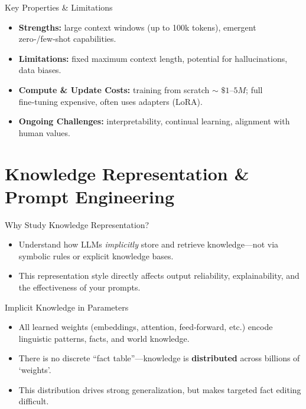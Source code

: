 \documentclass[german,10pt]{beamer}
\begin{document}
\begin{frame}{Key Properties \& Limitations}
  \begin{itemize}
    \item \textbf{Strengths:}
      large context windows (up to 100k tokens), emergent zero‑/few‑shot capabilities.
    \item \textbf{Limitations:}
      fixed maximum context length, potential for hallucinations, data biases.
    \item \textbf{Compute \& Update Costs:}
      training from scratch $\sim$ $\$1–5 M$; full fine‑tuning expensive, often uses adapters (LoRA).
    \item \textbf{Ongoing Challenges:}
      interpretability, continual learning, alignment with human values.
  \end{itemize}
\end{frame}


\section{Knowledge Representation \& Prompt Engineering}

\begin{frame}{Why Study Knowledge Representation?}
  \begin{itemize}
    \item Understand how LLMs \emph{implicitly} store and retrieve knowledge—not via symbolic rules or explicit knowledge bases.
    \item This representation style directly affects output reliability, explainability, and the effectiveness of your prompts.
  \end{itemize}
\end{frame}

\begin{frame}{Implicit Knowledge in Parameters}
  \begin{itemize}
    \item All learned weights (embeddings, attention, feed‑forward, etc.) encode linguistic patterns, facts, and world knowledge.
    \item There is no discrete “fact table”—knowledge is \textbf{distributed} across billions of `weights'.
    \item This distribution drives strong generalization, but makes targeted fact editing difficult.
  \end{itemize}
\end{frame}
\end{document}
